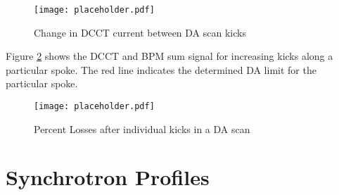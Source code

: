 \begin{figure}
	\centering
	\texttt{[image: placeholder.pdf]}
	\caption{Change in DCCT current between DA scan kicks}
	\label{fig:dcctKickLife}
\end{figure}

Figure \ref{fig:daLimit} shows the DCCT and BPM sum signal for increasing kicks along a particular spoke. The red line indicates the determined DA limit for the particular spoke.

\begin{figure}
	\centering
	\texttt{[image: placeholder.pdf]}
	\caption{Percent Losses after individual kicks in a DA scan}
	\label{fig:daLimit}
\end{figure}

\section{Synchrotron Profiles} \label{sec:synchProfiles}

